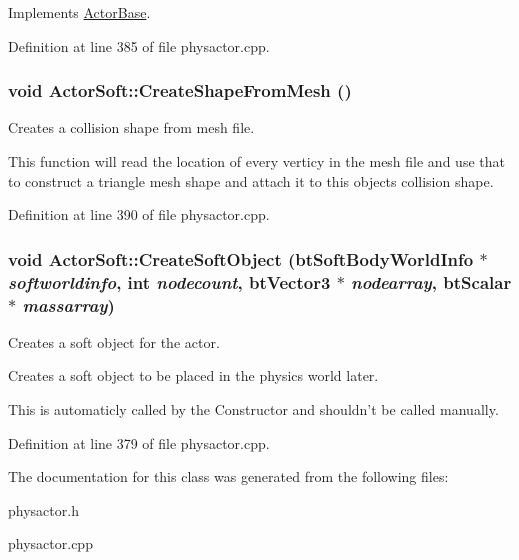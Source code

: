 Implements \hyperlink{classActorBase_a1af82a2ed960fd114518fdf84d5ff146}{ActorBase}.



Definition at line 385 of file physactor.cpp.

\hypertarget{classActorSoft_a55ac461f317aed2b812f07eb384b2a6d}{
\subsubsection[{CreateShapeFromMesh}]{\setlength{\rightskip}{0pt plus 5cm}void ActorSoft::CreateShapeFromMesh ()}}
\label{d5/da4/classActorSoft_a55ac461f317aed2b812f07eb384b2a6d}


Creates a collision shape from mesh file. 

This function will read the location of every verticy in the mesh file and use that to construct a triangle mesh shape and attach it to this objects collision shape. 

Definition at line 390 of file physactor.cpp.

\hypertarget{classActorSoft_a01a570c728d6cb96d1a40003d6b17e22}{
\subsubsection[{CreateSoftObject}]{\setlength{\rightskip}{0pt plus 5cm}void ActorSoft::CreateSoftObject (btSoftBodyWorldInfo $\ast$ {\em softworldinfo}, \/  int {\em nodecount}, \/  btVector3 $\ast$ {\em nodearray}, \/  btScalar $\ast$ {\em massarray})}}
\label{d5/da4/classActorSoft_a01a570c728d6cb96d1a40003d6b17e22}


Creates a soft object for the actor. 

Creates a soft object to be placed in the physics world later. \par
 This is automaticly called by the Constructor and shouldn't be called manually. 

Definition at line 379 of file physactor.cpp.



The documentation for this class was generated from the following files:\begin{DoxyCompactItemize}
\item 
physactor.h\item 
physactor.cpp\end{DoxyCompactItemize}
